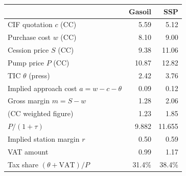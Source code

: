 \begin{tabular}{lrr}
\toprule
& Gasoil & SSP \\
\midrule
CIF quotation $c$ (CC) & 5.59 & 5.12 \\
Purchase cost $w$ (CC) & 8.10 & 9.00 \\
Cession price $S$ (CC) & 9.38 & 11.06 \\
Pump price $P$ (CC) & 10.87 & 12.82 \\
TIC $\theta$ (press) & 2.42 & 3.76 \\
\midrule
Implied approach cost $a = w - c - \theta$ & 0.09 & 0.12 \\
Gross margin $m = S - w$ & 1.28 & 2.06 \\
\quad (CC weighted figure) & 1.23 & 1.85 \\
$P/(1+\tau)$ & 9.882 & 11.655 \\
Implied station margin $r$ & 0.50 & 0.59 \\
VAT amount & 0.99 & 1.17 \\
Tax share $(\theta+\mathrm{VAT})/P$ & 31.4\% & 38.4\% \\
\bottomrule
\end{tabular}